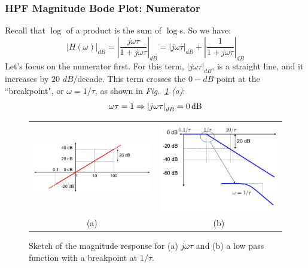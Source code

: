 \subsubsection{HPF Magnitude Bode Plot: Numerator}
Recall that $\log$ of a product is the sum of $\log$s.  So we have:
    \begin{equation}
        {\left| {H(\omega )} \right|_{dB}} = {\left| {\frac{{j\omega \tau }}{{1 + j\omega \tau }}} \right|_{dB}} = {\left| {j\omega \tau } \right|_{dB}} + {\left| {\frac{1}{{1 + j\omega \tau }}} \right|_{dB}}
    \end{equation}
Let's focus on the numerator first.  For this term, $\left|j\omega \tau  \right|_{dB} $, is a straight line, and it increases by $20$ $dB$/decade.  This term crosses the $0-dB$ point at the ``breakpoint", or $\omega = 1/\tau$, as shown in \emph{Fig.~\ref{fig:hpfnumden} (a)}:
    \begin{equation}
        \omega \tau  = 1 \Rightarrow {\left| {j\omega \tau } \right|_{dB}} = 0\,{\rm{dB}}
    \end{equation}
\begin{figure}[tb]
\centering
\begin{tabular}{cc}
\includegraphics[width=.55\columnwidth]{mod1_3_9_bode1} &
\includegraphics[width=.35\columnwidth]{mod1_3_10_bode2}\\
(a) & (b)\\
\end{tabular}
\caption{Sketch of the magnitude response for (a) $j\omega \tau$ and (b) a low pass function with a breakpoint at $1/\tau$.}
\label{fig:hpfnumden}
\end{figure}
